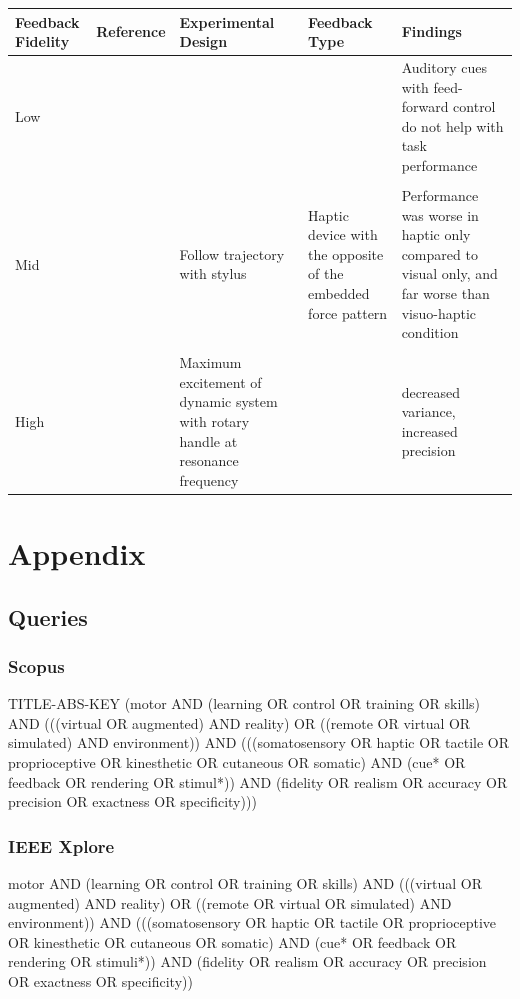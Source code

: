\documentclass[conference]{IEEEtran}
\begin{document}
\onecolumn

\begin{table}[]
\begin{tabular}{@{}p{}p{}p{}p{}p{}@{}}
\toprule
 Feedback Fidelity & Reference & Experimental Design & Feedback Type & Findings \\ \midrule
 Low & \cite{Huang2007VisualManipulation} &  &  & Auditory cues with feed-forward control do not help with task performance \\ \\
 Mid & \cite{Morris2007HapticLearning} & Follow trajectory with stylus & Haptic device with the opposite of the embedded force pattern & Performance was worse in haptic only compared to visual only, and far worse than visuo-haptic condition \\ \\
 High & \cite{Huang2007VisualManipulation} & Maximum excitement of dynamic system with rotary handle at resonance frequency &  & decreased variance, increased precision \\ \bottomrule
\end{tabular}
\end{table}

\twocolumn

\section*{Appendix}

\subsection{Queries}
\label{sec:queries}

\subsubsection{Scopus}
TITLE-ABS-KEY (motor AND (learning OR control OR training OR skills) AND (((virtual OR augmented) AND reality) OR ((remote OR virtual OR simulated) AND environment)) AND (((somatosensory OR haptic OR tactile OR proprioceptive OR kinesthetic OR cutaneous OR somatic) AND (cue* OR feedback OR rendering OR stimul*)) AND (fidelity OR realism OR accuracy OR precision OR exactness OR specificity)))

\subsubsection{IEEE Xplore}
motor AND (learning OR control OR training OR skills) AND (((virtual OR augmented) AND reality) OR ((remote OR virtual OR simulated) AND environment)) AND (((somatosensory OR haptic OR tactile OR proprioceptive OR kinesthetic OR cutaneous OR somatic) AND (cue* OR feedback OR rendering OR stimuli*)) AND (fidelity OR realism OR accuracy OR precision OR exactness OR specificity)) 
\end{document}
